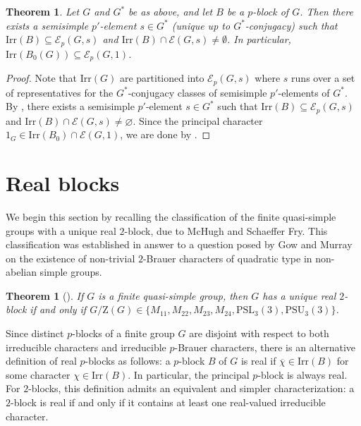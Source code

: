 \documentclass[10pt]{article}
\newtheorem{thm}[lem]{\bf Theorem}
\begin{document}
 




\begin{thm}\label{thm: blocks of lie type}
  Let $G$ and $G^*$ be as above,
  and let $B$ be a $p$-block of $G$.
  Then there exists a semisimple $p'$-element $s\in G^*$ (unique up to $G^*$-conjugacy)
  such that $\mathrm{Irr}(B)\subseteq \mathcal{E}_p(G,s)$ and $\mathrm{Irr}(B)\cap\mathcal{E}(G,s)\neq \emptyset$.
  In particular, $\mathrm{Irr}(B_0(G))\subseteq\mathcal{E}_p(G,1)$.
\end{thm}
\begin{proof}
  Note that $\mathrm{Irr}(G)$ are partitioned into $\mathcal{E}_p(G,s)$
  where $s$ runs over a set of representatives for the $G^*$-conjugacy classes of semisimple $p'$-elements of $G^*$.
  By \cite[Theorem 9.12]{cabanes04}, there exists a semisimple $p'$-element $s\in G^*$
  such that $\mathrm{Irr}(B)\subseteq \mathcal{E}_p(G,s)$ and $\mathrm{Irr}(B)\cap \mathcal{E}(G,s)\neq \varnothing$.
  Since the principal character $1_G\in \mathrm{Irr}(B_0)\cap\mathcal{E}(G,1)$,
  we are done by \cite[Definition 9.13]{cabanes04}.
\end{proof}





\section{Real blocks}


We begin this section by recalling the classification of the finite quasi-simple groups with a unique real $2$-block, due to McHugh and Schaeffer Fry. 
This classification was established in answer to  
 a question posed by Gow and Murray on the existence of non-trivial $2$-Brauer characters of quadratic type in non-abelian simple groups.





\begin{thm}[\mbox{\cite[Theorem 1.1]{mchugh26}}]\label{thm: urb}
  If $G$ is a finite quasi-simple group, then $G$ has a unique real $2$-block
  if and only if $G/\mathrm{Z}(G)\in \{ M_{11},M_{22},M_{23}, M_{24}, \mathrm{PSL}_{3}(3),\mathrm{PSU}_{3}(3) \}$. 
\end{thm}


Since distinct $p$-blocks of a finite group $G$ are disjoint with respect to both irreducible characters and irreducible $p$-Brauer characters, 
there is an alternative definition of real $p$-blocks as follows:
a $p$-block $B$ of $G$ is real if $\overline{\chi} \in \mathrm{Irr}(B)$ for some character $\chi \in \mathrm{Irr}(B)$.
  In particular, the principal $p$-block is always real.
For $2$-blocks, this definition admits an equivalent and simpler characterization: a $2$-block is real if and only if it contains at least one real-valued irreducible character.
\end{document}
